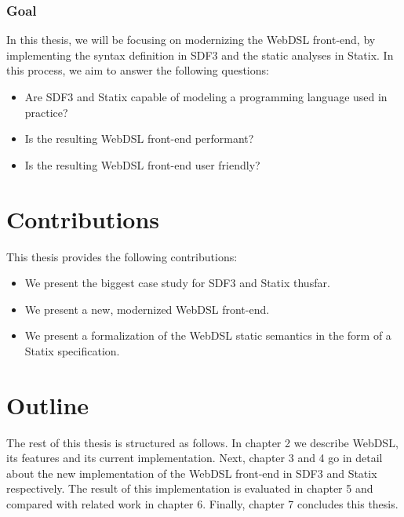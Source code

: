   \subsubsection{Goal}
  In this thesis, we will be focusing on modernizing the WebDSL front-end, by implementing the syntax definition in SDF3 and the static analyses in Statix. In this process, we aim to answer the following questions:
  
  \begin{itemize}
    \item Are SDF3 and Statix capable of modeling a programming language used in practice?
    \item Is the resulting WebDSL front-end performant?
    \item Is the resulting WebDSL front-end user friendly?
  \end{itemize}

  \section{Contributions}
    This thesis provides the following contributions:

    \begin{itemize}
      \item We present the biggest case study for SDF3 and Statix thusfar.
      \item We present a new, modernized WebDSL front-end.
      \item We present a formalization of the WebDSL static semantics in the form of a Statix specification.
    \end{itemize}

  \section{Outline}
    The rest of this thesis is structured as follows. In chapter 2 we describe WebDSL, its features and its current implementation. Next, chapter 3 and 4 go in detail about the new implementation of the WebDSL front-end in SDF3 and Statix respectively. The result of this implementation is evaluated in chapter 5 and compared with related work in chapter 6. Finally, chapter 7 concludes this thesis.
